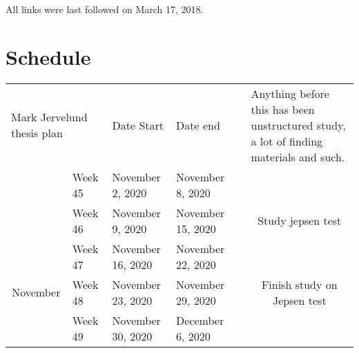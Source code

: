 \documentclass[
  a4paper,  %
  twoside,  %
  bibliography=totoc,
  headsepline,
  cleardoublepage=empty,
  parskip=half,
  draft=false
]{scrbook}
\begin{document}
\printbibliography

All links were last followed on March 17, 2018.



\newpage
\appendix


\section{Schedule}

\begin{table}[]
\begin{tabular}{clllcc}
\multicolumn{2}{l}{Mark Jervelund thesis plan} & Date Start        & Date end          & \multicolumn{1}{l}{}                                                                     & \multicolumn{1}{l}{Anything before this has been unstructured study, a lot of finding materials and such.}                 \\
                                & Week 45      & November 2, 2020  & November 8, 2020  &                                                                                          &                                                                                                                            \\
                                & Week 46      & November 9, 2020  & November 15, 2020 &                                                                                          & \multirow{-2}{*}{Study jepsen test}                                                                                        \\
                                & Week 47      & November 16, 2020 & November 22, 2020 &                                                                                          &                                                                                                                            \\
\multirow{-4}{*}{November}      & Week 48      & November 23, 2020 & November 29, 2020 &                                                                                          & \multirow{-2}{*}{Finish study on Jepsen test}                                                                              \\
                                & Week 49      & November 30, 2020 & December 6, 2020  &                                                                                          &                                                                                                                            \\

\end{tabular}
\end{table}
\end{document}
